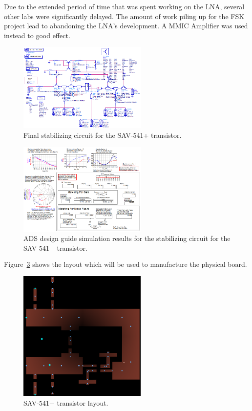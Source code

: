 \documentclass[conference]{IEEEtran}
\begin{document}
Due to the extended period of time that was spent working on the LNA, several other labs were significantly delayed. The amount of work piling up for the FSK project lead to abandoning the LNA's development. A MMIC Amplifier was used instead to good effect. 

\begin{figure}[!h]
\centering
\includegraphics[width=2.5in]{pics/FinalStabilizingCircuit.png}
\caption{Final stabilizing circuit for the SAV-541+ transistor.}
\label{fig:finalstabcircuit}
\end{figure}

\begin{figure}[!h]
\centering
\includegraphics[width=2.5in]{pics/FinalStabilizingSimulation.png}
\caption{ADS design guide simulation results for the stabilizing circuit for the SAV-541+ transistor.}
\label{fig:finalstabsimulation}
\end{figure}

Figure~\ref{fig:lnaLayout} shows the layout which will be used to manufacture the physical board.
\begin{figure}[!h]
\centering
\includegraphics[width=2.5in]{LNApics/LNAlayout.png}
\caption{SAV-541+ transistor layout.}
\label{fig:lnaLayout}
\end{figure}
\end{document}
